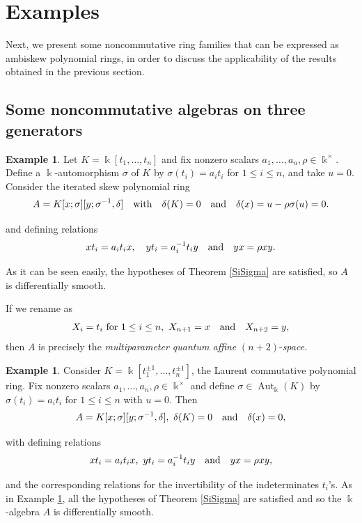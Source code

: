 \documentclass{amsart}
\theoremstyle{definition}
\newtheorem{example}[theorem]{Example}
\theoremstyle{remark}
\numberwithin{equation}{section}
\begin{document}
\section{Examples}\label{Illustrativeexamplesambiskew}

Next, we present some noncommutative ring families that can be expressed as ambiskew polynomial rings, in order to discuss the applicability of the results obtained in the previous section.


\subsection{Some noncommutative algebras on three generators}

\begin{example}\label{QAP}
Let $K=\Bbbk[t_1,\ldots,t_n]$ and fix nonzero scalars $a_1,\ldots,a_n,\rho\in \Bbbk^\times$. Define a $\Bbbk$-automorphism $\sigma$ of $K$ by $\sigma(t_i) = a_i t_i$ for $1\leq i\leq n$, and take $u=0$. Consider the iterated skew polynomial ring
\[
A=K[x;\sigma][y;\sigma^{-1},\delta] 
\quad {\rm with} \quad \delta(K)=0 \quad {\rm and} \quad \delta(x)=u-\rho\sigma(u)=0.
\]

and defining relations
\[
xt_i = a_i t_i x, \quad yt_i = a_i^{-1} t_i y \quad {\rm and} \quad yx = \rho xy.
\]

As it can be seen easily, the hypotheses of Theorem \ref{SiSigma} are satisfied, so $A$ is differentially smooth.

If we rename as 
\[
X_i=t_i \text{ for } 1\leq i\leq n,\ X_{n+1}=x \quad {\rm and} \quad X_{n+2}=y,
\]
then $A$ is precisely the {\em multiparameter quantum affine} $(n+2)$-{\em space}.
\end{example}

\begin{example}\label{Laurent}
Consider $K=\Bbbk[t_1^{\pm 1},\ldots,t_n^{\pm 1}]$, the Laurent commutative polynomial ring. Fix nonzero scalars $a_1,\ldots,a_n,\rho\in \Bbbk^\times$ and define $\sigma\in \operatorname{Aut}_{\Bbbk}(K)$ by $\sigma(t_i)=a_i t_i$ for $1\leq i\leq n$ with $u=0$. Then
\[
A = K[x;\sigma][y;\sigma^{-1},\delta], \ \delta(K)=0 \quad {\rm and} \quad \delta(x) = 0,
\]

with defining relations
\[
xt_i=a_i t_i x, \ yt_i=a_i^{-1} t_i y \quad {\rm and} \quad yx=\rho xy,
\]

and the corresponding relations for the invertibility of the indeterminates $t_i$'s. As in Example \ref{QAP}, all the hypotheses of Theorem
\ref{SiSigma} are satisfied and so the $\Bbbk$-algebra $A$ is differentially smooth.
\end{example}
\end{document}
